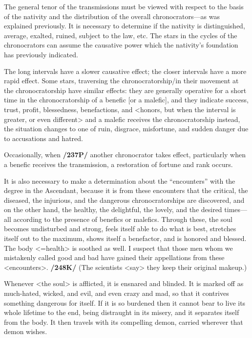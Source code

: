 The  general tenor of the transmissions must be viewed with respect to the basis of the nativity and the distribution of the overall chronocrators—as was explained previously. It is necessary to determine if the nativity is distinguished, average, exalted, ruined, subject to the law, etc. The stars in the cycles of the chronocrators can assume the
causative power which the nativity’s foundation has previously indicated.

The long intervals have a slower causative effect; the closer intervals have a more rapid effect. Some stars, traversing the chronocratorship/in their movement at the chronocratorship have similar effects: they
are generally operative for a short time in the chronocratorship of a benefic [or a malefic], and they indicate success, trust, profit, blessedness, benefactions, and <honors, but when the interval is greater, or even different> and a malefic receives the chronocratorship instead, the situation changes to one of ruin, disgrace,
misfortune, and sudden danger due to accusations and hatred. 

Occasionally, when \textbf{/237P/} another chronocrator takes effect, particularly when a benefic receives the transmission, a restoration of fortune and rank occurs. 

It  is also necessary to make a determination about the “encounters” with the degree in the Ascendant, because it is from these encounters that the critical, the diseased, the injurious, and the dangerous chronocratorships are discovered, and on the other hand, the healthy, the delightful, the lovely, and the desired times—all according to the presence of benefics or malefics. Through these, the soul becomes undisturbed and strong, feels itself able to do what is best, stretches itself out to the maximum, shows itself a benefactor, and is honored and blessed. The body <=health> is soothed as well. I suspect that those men whom we mistakenly called good and bad have gained their appellations from these <encounters>. \textbf{/248K/} (The scientists <say> they keep their original makeup.) 

Whenever <the soul> is afflicted, it is ensnared and blinded. It is marked off as much-hated, wicked, and evil, and even crazy and mad, so that it contrives something dangerous for itself. If it is so burdened then it cannot bear to live its whole lifetime to the end, being distraught in its misery, and it separates itself from the body. It then travels with its compelling demon, carried wherever that demon wishes.
\newpage